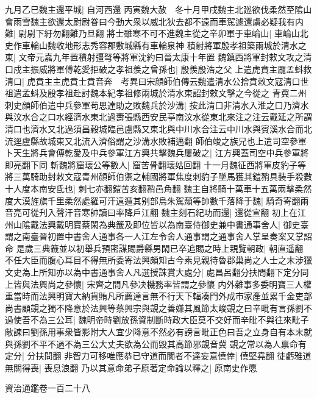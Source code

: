 九月乙巳魏主還平城|{
	自河西還}
丙寅魏大赦　冬十月甲戌魏主北廵欲伐柔然至隂山會雨雪魏主欲還太尉尉眷曰今動大衆以威北狄去都不遠而車駕遽還虜必疑我有内難|{
	尉尉下紆勿翻難乃旦翻}
將士雖寒不可不進魏主從之辛卯軍于車崘山|{
	車崘山北史作車輪山魏收地形志秀容郡敷城縣有車輪泉神}
積射將軍殷孝祖築兩城於清水之東|{
	文帝元嘉九年置積射彊弩等將軍沈約曰晉太康十年置}
魏鎮西將軍封敕文攻之清口戍主振威將軍傅乾愛拒破之孝祖羨之曾孫也|{
	殷羨殷浩之父}
上遣虎賁主龎孟蚪救清口|{
	虎賁主主虎賁士賁音奔　考異曰宋顔師伯傳云魏遣清水公捨賁敕文寇清口世祖遣孟蚪及殷孝祖赴討魏本紀孝祖修兩城於清水東詔封敕文擊之今從之}
青冀二州刺史顔師伯遣中兵參軍苟思達助之敗魏兵於沙溝|{
	按此清口非清水入淮之口乃濟水與汶水合之口水經濟水東北過夀張縣西安民亭南汶水從東北來注之注云戴延之所謂清口也濟水又北過須昌穀城臨邑盧縣又東北與中川水合注云中川水與賓溪水合而北流逕盧縣故城東又北流入濟俗謂之沙溝水敗補邁翻}
師伯竣之族兄也上遣司空參軍卜天生將兵會傅乾愛及中兵參軍江方興共擊魏兵屢破之|{
	江方興蓋司空中兵參軍將即亮翻下同}
斬魏將窟瓌公等數人|{
	窟苦骨翻瓌姑回翻}
十一月魏征西將軍皮豹子等將三萬騎助封敕文寇青州顔師伯禦之輔國將軍焦度刺豹子墜馬獲其鎧矟具裝手殺數十人度本南安氐也|{
	刺七亦翻鎧苦亥翻矟邑角翻}
魏主自將騎十萬車十五萬兩擊柔然度大漠旌旗千里柔然處羅可汗遠遁其别部烏朱駕頹等帥數千落降于魏|{
	騎奇寄翻兩音亮可從刋入聲汗音寒帥讀曰率降戶江翻}
魏主刻石紀功而還|{
	還從宣翻}
初上在江州山隂戴法興戴明寶蔡閑為典籖及即位皆以為南臺侍御史兼中書通事舍人|{
	御史臺謂之南臺晉初置中書舍人通事各一人江左令舍人通事謂之通事舍人掌呈奏案又掌詔命}
是歲三典籖並以初舉兵預密謀賜爵縣男閑已卒追賜之時上親覽朝政|{
	朝直遥翻}
不任大臣而腹心耳目不得無所委寄法興頗知古今素見親待魯郡巢尚之人士之末涉獵文史為上所知亦以為中書通事舍人凡選授誅賞大處分|{
	處昌呂翻分扶問翻下定分同}
上皆與法興尚之參懷|{
	宋齊之間凡參决機務率皆謂之參懷}
内外雜事多委明寶三人權重當時而法興明寶大納貨賄凡所薦達言無不行天下輻凑門外成市家產並累千金吏部尚書顧覬之獨不降意於法興等蔡興宗與覬之善嫌其風節太峻覬之曰辛毗有言孫劉不過使吾不為三公耳|{
	魏明帝時劉放孫資制斷時政大臣莫不交好而辛毗不與往來毗子敞諫曰劉孫用事衆皆影附大人宜少降意不然必有謗言毗正色曰吾之立身自有本末就與孫劉不平不過不為三公大丈夫欲為公而毁其高節邪覬音冀}
覬之常以為人禀命有定分|{
	分扶問翻}
非智力可移唯應恭已守道而闇者不達妄意僥倖|{
	僥堅堯翻}
徒虧雅道無關得喪|{
	喪息浪翻}
乃以其意命弟子原著定命論以釋之|{
	原南史作愿}


資治通鑑卷一百二十八
